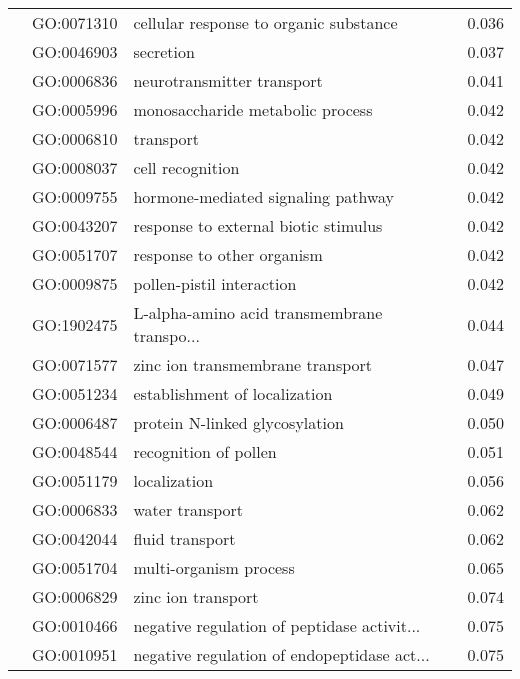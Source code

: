 \begin{longtable}{lllr}
   & GO:0071310 &       cellular response to organic substance &         0.036 \\
   & GO:0046903 &                                    secretion &         0.037 \\
   & GO:0006836 &                   neurotransmitter transport &         0.041 \\
   & GO:0005996 &             monosaccharide metabolic process &         0.042 \\
   & GO:0006810 &                                    transport &         0.042 \\
   & GO:0008037 &                             cell recognition &         0.042 \\
   & GO:0009755 &           hormone-mediated signaling pathway &         0.042 \\
   & GO:0043207 &         response to external biotic stimulus &         0.042 \\
   & GO:0051707 &                   response to other organism &         0.042 \\
   & GO:0009875 &                    pollen-pistil interaction &         0.042 \\
   & GO:1902475 &  L-alpha-amino acid transmembrane transpo... &         0.044 \\
   & GO:0071577 &             zinc ion transmembrane transport &         0.047 \\
   & GO:0051234 &                establishment of localization &         0.049 \\
   & GO:0006487 &               protein N-linked glycosylation &         0.050 \\
   & GO:0048544 &                        recognition of pollen &         0.051 \\
   & GO:0051179 &                                 localization &         0.056 \\
   & GO:0006833 &                              water transport &         0.062 \\
   & GO:0042044 &                              fluid transport &         0.062 \\
   & GO:0051704 &                       multi-organism process &         0.065 \\
   & GO:0006829 &                           zinc ion transport &         0.074 \\
   & GO:0010466 &  negative regulation of peptidase activit... &         0.075 \\
   & GO:0010951 &  negative regulation of endopeptidase act... &         0.075 \\

\end{longtable}
